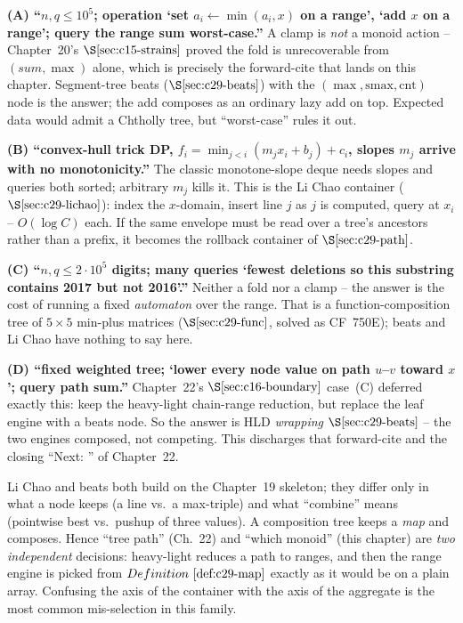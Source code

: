 \begin{comparisonbox}
\textbf{(A) ``\(n,q\le10^5\); operation `set \(a_i\leftarrow\min(a_i,x)\) on a range', `add \(x\) on a range'; query the range sum worst-case.''}
A clamp is \emph{not} a monoid action -- Chapter~20's \(\secref{c15-strains}\) proved
the fold is unrecoverable from \((\mathit{sum},\max)\) alone, which is precisely the
forward-cite that lands on this chapter.  Segment-tree beats
(\(\secref{c29-beats}\)) with the \((\max,\mathrm{smax},\mathrm{cnt})\) node is the
answer; the add composes as an ordinary lazy add on top.  Expected data would admit
a Chtholly tree, but ``worst-case'' rules it out.

\textbf{(B) ``convex-hull trick DP, \(f_i=\min_{j<i}(m_j x_i+b_j)+c_i\), slopes \(m_j\) arrive with no monotonicity.''}
The classic monotone-slope deque needs slopes and queries both sorted; arbitrary
\(m_j\) kills it.  This is the Li Chao container (\(\secref{c29-lichao}\)): index the
\(x\)-domain, insert line \(j\) as \(j\) is computed, query at \(x_i\) --
\(O(\log C)\) each.  If the same envelope must be read over a tree's ancestors
rather than a prefix, it becomes the rollback container of \(\secref{c29-path}\).

\textbf{(C) ``\(n,q\le2\cdot10^5\) digits; many queries `fewest deletions so this substring contains 2017 but not 2016'.''}
Neither a fold nor a clamp -- the answer is the cost of running a fixed
\emph{automaton} over the range.  That is a function-composition tree of
\(5\times5\) min-plus matrices (\(\secref{c29-func}\), solved as CF~750E); beats and
Li Chao have nothing to say here.

\textbf{(D) ``fixed weighted tree; `lower every node value on path \(u\)--\(v\) toward \(x\)'; query path sum.''}
Chapter~22's \(\secref{c16-boundary}\) case~(C) deferred exactly this: keep the
heavy-light chain-range reduction, but replace the leaf engine with a beats node.
So the answer is HLD \emph{wrapping} \(\secref{c29-beats}\) -- the two engines
composed, not competing.  This discharges that forward-cite and the closing
``Next: '' of Chapter~22.
\end{comparisonbox}

\begin{observation}
Li Chao and beats both build on the Chapter~19 skeleton; they differ only in what
a node keeps (a line vs.\ a max-triple) and what ``combine'' means (pointwise best
vs.\ pushup of three values).  A composition tree keeps a \emph{map} and composes.
Hence ``tree path'' (Ch.~22) and ``which monoid'' (this chapter) are \emph{two
independent} decisions: heavy-light reduces a path to ranges, and then the range
engine is picked from \(\defref{c29-map}\) exactly as it would be on a plain array.
Confusing the axis of the container with the axis of the aggregate is the most
common mis-selection in this family.
\end{observation}

